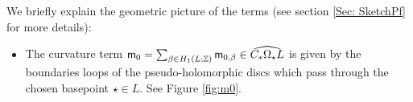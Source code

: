 \documentclass[10pt]{amsart}
\numberwithin{equation}{section}
\theoremstyle{plain}
\theoremstyle{definition}
\theoremstyle{remark}
\numberwithin{equation}{section}
\newcommand{\Z}{\mathbb{Z}}
\newcommand{\wh}[1]{\widehat{#1}}
\newcommand{\mm}{\textup{\textsf{m}}}
\begin{document}
We briefly explain the geometric picture of the terms (see section \ref{Sec: SketchPf} for more details): 
\begin{itemize}
	\item The curvature term $\mm_0 = \sum_{\beta\in H_1(L;\Z)} \mm_{0,\beta} \in \wh{C_*\Omega_\star L}$ is given by the boundaries loops of the pseudo-holomorphic discs which pass through the chosen basepoint $\star \in L$. 
	See Figure \ref{fig:m0}.

	
\begin{figure}
\centering
{}
\end{figure}
\end{itemize}
\end{document}
